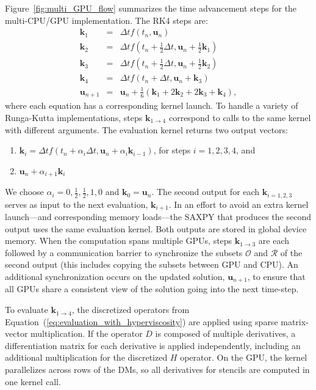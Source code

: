 \documentclass{report}
\begin{document}
Figure~\ref{fig:multi_GPU_flow} summarizes the time advancement steps for the multi-CPU/GPU implementation. The RK4 steps are: 
\begin{eqnarray*} 
\mathbf{k}_1 &=& \Delta t f(t_n, \mathbf{u}_n) \\
\mathbf{k}_2 &=& \Delta t f(t_n+\frac{1}{2}\Delta t, \mathbf{u}_n + \frac{1}{2}\mathbf{k}_1) \\
\mathbf{k}_3 &=& \Delta t f(t_n+\frac{1}{2}\Delta t, \mathbf{u}_n + \frac{1}{2}\mathbf{k}_2) \\
\mathbf{k}_4 &=& \Delta t f(t_n+\Delta t, \mathbf{u}_n + \mathbf{k}_3) \\
\mathbf{u}_{n+1} &=& \mathbf{u}_{n} + \frac{1}{6}(\mathbf{k}_1 + 2\mathbf{k}_2 + 2\mathbf{k}_3 +\mathbf{k}_4),
\label{eqn:rk4}
\end{eqnarray*}
where each equation has a corresponding kernel launch. To handle a variety of Runga-Kutta implementations, steps $\mathbf{k}_{1\rightarrow4}$ correspond to calls to the same kernel with different arguments. The evaluation kernel returns two output vectors: 
\begin{enumerate} 
\item $\mathbf{k}_i = \Delta t f(t_n + \alpha_{i} \Delta t, \mathbf{u}_n + \alpha_{i} \mathbf{k}_{i-1})$, for steps $i=1,2,3,4$, and
\item  $\mathbf{u}_n + \alpha_{i+1} \mathbf{k}_i$
\end{enumerate} 
We choose $\alpha_{i}=0, \frac{1}{2}, \frac{1}{2}, 1, 0$ and $\mathbf{k}_{0} = \mathbf{u}_n$. The second output for each $\mathbf{k}_{i=1,2,3}$ serves as input to the next evaluation, $\mathbf{k}_{i+1}$. In an effort to avoid an extra kernel launch---and corresponding memory loads---the SAXPY that produces the second output uses the same evaluation kernel. Both outputs are stored in global device memory. When the computation spans multiple GPUs, steps $\mathbf{k}_{1\rightarrow3}$ are each followed by a communication barrier to synchronize the subsets $\mathcal{O}$ and $\mathcal{R}$ of the second output (this includes copying the subsets between GPU and CPU). An additional synchronization occurs on the updated  solution, $\mathbf{u}_{n+1}$, to ensure that all GPUs share a consistent view of the solution going into the next time-step.

To evaluate $\mathbf{k}_{1\rightarrow4}$, the discretized operators from Equation~(\ref{eq:evaluation_with_hyperviscosity}) are applied using sparse matrix-vector multiplication. If the operator $D$ is composed of multiple derivatives, a differentiation matrix for each derivative is applied independently, including an additional multiplication for the discretized $H$ operator.
 On the GPU, the kernel parallelizes across rows of the DMs, so all derivatives for stencils are computed in one kernel call.
\end{document}

